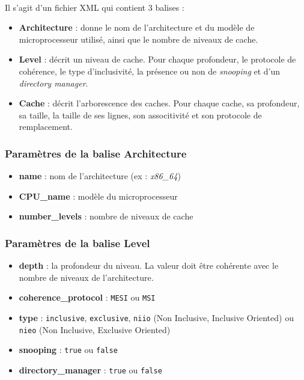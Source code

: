 \paragraph{}
Il s'agit d'un fichier XML qui contient 3 balises :
\begin{itemize}
  \item \textbf{Architecture} : donne le nom de l'architecture et du modèle de microprocesseur utilisé, ainsi que le nombre de niveaux de cache.
  \item \textbf{Level} : décrit un niveau de cache. Pour chaque profondeur, le protocole de cohérence, le type d'inclusivité, la présence ou non de \textit{snooping} et d'un \textit{directory manager}.
  \item \textbf{Cache} : décrit l'arborescence des caches. Pour chaque cache, sa profondeur, sa taille, la taille de ses lignes, son associtivité et son protocole de remplacement.
\end{itemize}

\subsubsection{Paramètres de la balise Architecture}

\begin{itemize}
  \item \textbf{name} : nom de l'architecture (ex : \textit{x86\_64})
  \item \textbf{CPU\_name} : modèle du microprocesseur
  \item \textbf{number\_levels} : nombre de niveaux de cache
\end{itemize}

\subsubsection{Paramètres de la balise Level}

\begin{itemize}
  \item \textbf{depth} : la profondeur du niveau. La valeur doit être cohérente avec le nombre de niveaux de l'architecture.
  \item \textbf{coherence\_protocol} : \verb?MESI? ou \verb?MSI?
  \item \textbf{type} : \verb?inclusive?, \verb?exclusive?, \verb?niio? (Non Inclusive, Inclusive Oriented) ou \verb?nieo? (Non Inclusive, Exclusive Oriented)
  \item \textbf{snooping} : \verb?true? ou \verb?false?
  \item \textbf{directory\_manager} : \verb?true? ou \verb?false?
\end{itemize}

